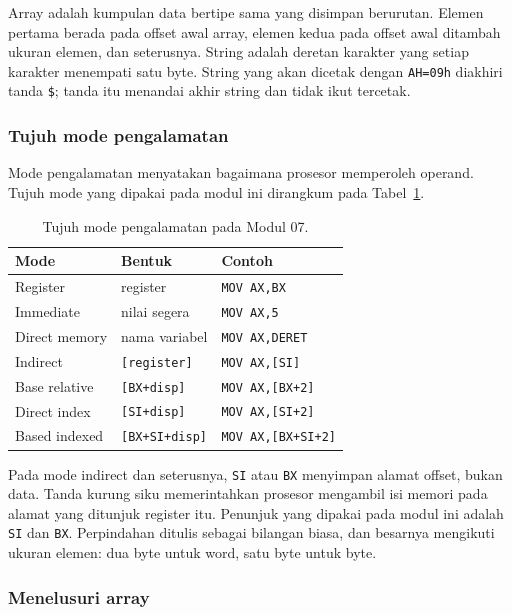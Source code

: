 Array adalah kumpulan data bertipe sama yang disimpan berurutan.
Elemen pertama berada pada offset awal array, elemen kedua pada
offset awal ditambah ukuran elemen, dan seterusnya. String adalah
deretan karakter yang setiap karakter menempati satu byte. String
yang akan dicetak dengan \texttt{AH=09h} diakhiri tanda \texttt{\$};
tanda itu menandai akhir string dan tidak ikut tercetak.

\subsubsection*{Tujuh mode pengalamatan}

Mode pengalamatan menyatakan bagaimana prosesor memperoleh operand.
Tujuh mode yang dipakai pada modul ini dirangkum pada
Tabel~\ref{tab:m07-mode}.

\begin{table}[H]
    \centering
    \caption{Tujuh mode pengalamatan pada Modul 07.}
    \label{tab:m07-mode}
    \small
    \begin{tabular}{@{}lll@{}}
        \toprule
        \textbf{Mode} & \textbf{Bentuk} & \textbf{Contoh} \\
        \midrule
        Register & register & \texttt{MOV AX,BX} \\
        Immediate & nilai segera & \texttt{MOV AX,5} \\
        Direct memory & nama variabel & \texttt{MOV AX,DERET} \\
        Indirect & \texttt{[register]} & \texttt{MOV AX,[SI]} \\
        Base relative & \texttt{[BX+disp]} & \texttt{MOV AX,[BX+2]} \\
        Direct index & \texttt{[SI+disp]} & \texttt{MOV AX,[SI+2]} \\
        Based indexed & \texttt{[BX+SI+disp]} &
        \texttt{MOV AX,[BX+SI+2]} \\
        \bottomrule
    \end{tabular}
\end{table}

Pada mode indirect dan seterusnya, \texttt{SI} atau \texttt{BX}
menyimpan alamat offset, bukan data. Tanda kurung siku memerintahkan
prosesor mengambil isi memori pada alamat yang ditunjuk register itu.
Penunjuk yang dipakai pada modul ini adalah \texttt{SI} dan
\texttt{BX}. Perpindahan ditulis sebagai bilangan biasa, dan besarnya
mengikuti ukuran elemen: dua byte untuk word, satu byte untuk byte.

\subsubsection*{Menelusuri array}

